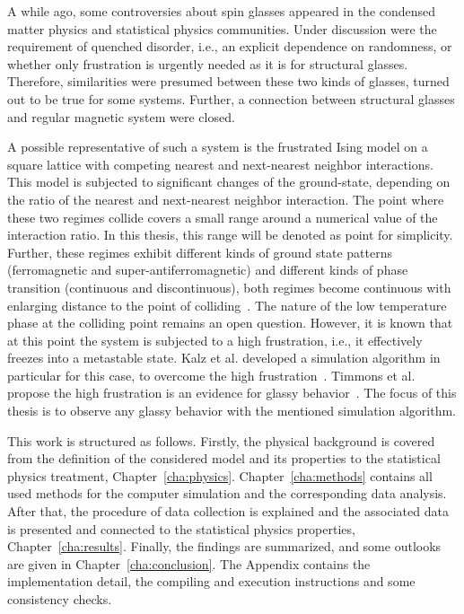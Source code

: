 


A while ago, some controversies about spin glasses appeared in the condensed matter physics and statistical physics communities. Under discussion 
were the requirement of quenched disorder, i.e., an explicit dependence on randomness, or whether only frustration is urgently needed as it is for 
structural glasses. Therefore, similarities were presumed between these two kinds of glasses, turned out to be true for some systems. Further, a 
connection between structural glasses and regular magnetic system were closed.

A possible representative of such a system is the frustrated Ising model on a square lattice with competing nearest and next-nearest neighbor interactions.
This model is subjected to significant changes of the ground-state, depending on the ratio of the nearest and next-nearest neighbor interaction. 
The point where these two regimes collide covers a small range around a numerical value of the interaction ratio. In this thesis, this range will 
be denoted as point for simplicity. Further, these regimes exhibit different kinds of ground state patterns (ferromagnetic and super-antiferromagnetic) 
and different kinds of phase transition (continuous and discontinuous), both regimes become 
continuous with enlarging distance to the point of colliding~\cite{Kalz2008,Jin2012,Yoshiyama2023}. The nature of the low temperature phase at the colliding point remains an open question. However, 
it is known that at this point the system is subjected to a high frustration, i.e., it effectively freezes into a metastable state. Kalz et al. developed a 
simulation algorithm in particular for this case, to overcome the high frustration~\cite{Kalz2008}. Timmons et al. propose the high frustration is an 
evidence for glassy behavior~\cite{Timmons2018}. The focus of this thesis is to observe any glassy behavior with the mentioned simulation algorithm.  

This work is structured as follows. Firstly, the physical background is covered from the definition of the considered model and its properties to the 
statistical physics treatment, Chapter~\ref{cha:physics}. Chapter~\ref{cha:methods} contains all used methods for the computer simulation and the 
corresponding data analysis. After that, the procedure of data collection is explained and the associated data is presented and connected to the 
statistical physics properties, Chapter~\ref{cha:results}. Finally, the findings are summarized, and some outlooks are given in 
Chapter~\ref{cha:conclusion}. The Appendix contains the implementation detail, the compiling and execution instructions and some consistency checks. 


